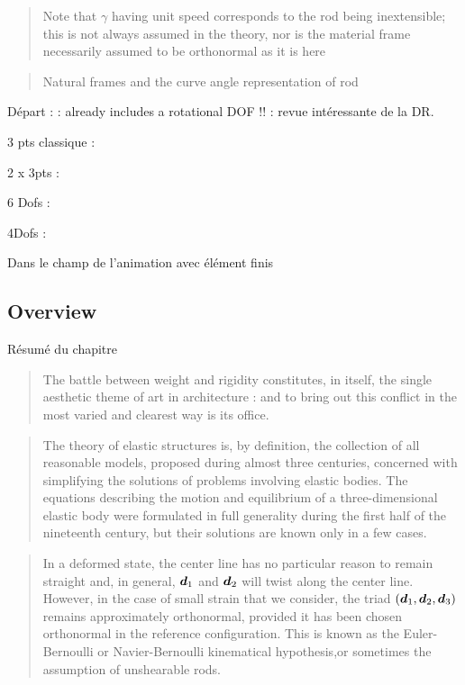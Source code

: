 \blockcquote[p.~607]{Langer1996}{Note that $\gamma$ having unit speed corresponds to the rod being inextensible; this is not always assumed in the theory, nor is the material frame necessarily assumed to be orthonormal as it is here}

\blockcquote[p.~607]{Langer1996}{Natural frames and the curve angle representation of rod}


Départ :
\cite{Day1965} : already includes a rotational DOF !!
\cite{Wakefield1980}
\cite{Barnes1999} : revue intéressante de la DR.

3 pts classique :
\cite{Adriaenssens1999}
\cite{Douthe2006}

2 x 3pts :
\cite{Barnes2013}

6 Dofs :
\cite{DAmico2014}

4Dofs :
\cite{DuPeloux2015}
\cite{DAmico2016}

Dans le champ de l'animation  avec élément finis
\cite{Duan2013}
\cite{Meier2014}


\subsection{Overview}
Résumé du chapitre

\blockcquote[p.~xvii]{Benvenuto1991b}{The battle between weight and rigidity constitutes, in itself, the single aesthetic theme of art in architecture : and to bring out this conflict in the most varied and clearest way is its office.}

\blockcquote[p.~xvii]{Villaggio1997}{The theory of elastic structures is, by definition, the collection of all reasonable models, proposed during almost three centuries, concerned with simplifying the solutions of problems involving elastic bodies. The equations describing the motion and equilibrium of a three-dimensional elastic body were formulated in full generality during the first half of the nineteenth century, but their solutions are known only in a few cases.}

\blockcquote[p.~68]{Audoly2010}{In a deformed state, the center line has no particular reason to remain straight and, in general, $\boldsymbol{d}_1$ and $\boldsymbol{d}_2$ will twist along the center line. However, in the case of small strain that we consider, the triad $(\boldsymbol{d}_1,\boldsymbol{d}_2,\boldsymbol{d}_3)$ remains approximately orthonormal, provided it has been chosen orthonormal in the reference configuration. This is known as the Euler-Bernoulli or Navier-Bernoulli kinematical hypothesis,or sometimes the assumption of unshearable rods.}


